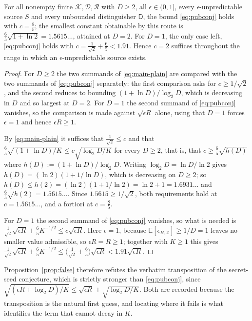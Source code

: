 \documentclass{aicr-solution}
\newcommand{\calK}{\mathcal{K}}
\newcommand{\calD}{\mathcal{D}}
\newcommand{\calR}{\mathcal{R}}
\begin{document}
\begin{corollary}\label{cor:pub}
For all nonempty finite $\calK, \calD, \calR$ with $D \ge 2$, all $\epsilon \in (0,1]$, every
$\epsilon$-unpredictable source $S$ and every unbounded distinguisher $\mathsf{D}$, the bound
\eqref{eq:pubconj} holds with $c = \tfrac85$; the smallest constant obtainable by this route is
$\tfrac65\sqrt{1 + \ln 2} = 1.5615\ldots$, attained at $D = 2$. For $D = 1$, the only case left,
\eqref{eq:pubconj} holds with $c = \tfrac{1}{\sqrt2} + \tfrac65 < 1.91$. Hence $c = 2$ suffices
throughout the range in which an $\epsilon$-unpredictable source exists.
\end{corollary}

\begin{proof}
For $D \ge 2$ the two summands of \eqref{eq:main-plain} are compared with the two summands of
\eqref{eq:pubconj} separately: the first comparison asks for $c \ge 1/\sqrt2$, and the second
reduces to bounding $(1+\ln D)/\log_2 D$, which is decreasing in $D$ and so largest at $D = 2$.
For $D = 1$ the second summand of \eqref{eq:pubconj} vanishes, so the comparison is made against
$\sqrt{\epsilon R}$ alone, using that $D = 1$ forces $\epsilon = 1$ and hence $\epsilon R \ge 1$.

By \eqref{eq:main-plain} it suffices that $\tfrac{1}{\sqrt2} \le c$ and that
$\tfrac65\sqrt{(1+\ln D)/K} \le c\sqrt{\log_2 D / K}$ for every $D \ge 2$, that is, that
$c \ge \tfrac65\sqrt{h(D)}$ where $h(D) := (1+\ln D)/\log_2 D$. Writing
$\log_2 D = \ln D/\ln 2$ gives $h(D) = (\ln 2)(1 + 1/\ln D)$, which is decreasing on $D \ge 2$;
so $h(D) \le h(2) = (\ln 2)(1 + 1/\ln 2) = \ln 2 + 1 = 1.6931\ldots$ and
$\tfrac65\sqrt{h(2)} = 1.5615\ldots$. Since $1.5615 \ge 1/\sqrt2$, both requirements hold at
$c = 1.5615\ldots$, and a fortiori at $c = \tfrac85$.

For $D = 1$ the second summand of \eqref{eq:pubconj} vanishes, so what is needed is
$\tfrac{1}{\sqrt2}\sqrt{\epsilon R} + \tfrac65 K^{-1/2} \le c\sqrt{\epsilon R}$. Here $\epsilon = 1$,
because $\mathbb{E}[\epsilon_{H,Z}] \ge 1/D = 1$ leaves no smaller value admissible, so
$\epsilon R = R \ge 1$; together with $K \ge 1$ this gives
$\tfrac{1}{\sqrt2}\sqrt{\epsilon R} + \tfrac65 K^{-1/2} \le
\bigl(\tfrac{1}{\sqrt2} + \tfrac65\bigr)\sqrt{\epsilon R} < 1.91\sqrt{\epsilon R}$.
\end{proof}

Proposition~\ref{prop:false} therefore refutes the verbatim transposition of the secret-seed
conjecture, which is strictly stronger than \eqref{eq:pubconj}, since
$\sqrt{(\epsilon R + \log_2 D)/K} \le \sqrt{\epsilon R} + \sqrt{\log_2 D/K}$. Both are recorded
because the transposition is the natural first guess, and locating where it fails is what
identifies the term that cannot decay in $K$.
\end{document}
